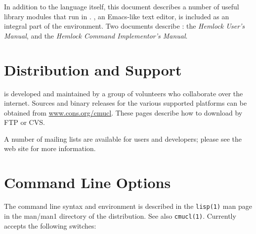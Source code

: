 In addition to the language itself, this document describes a number
of useful library modules that run in \cmucl. \hemlock, an Emacs-like
text editor, is included as an integral part of the \cmucl{}
environment. Two documents describe \hemlock{}: the {\it Hemlock
User's Manual}, and the {\it Hemlock Command Implementor's Manual}.


\section{Distribution and Support}

\cmucl{} is developed and maintained by a group of volunteers who
collaborate over the internet. Sources and binary releases for the
various supported platforms can be obtained from
\href{http://www.cons.org/cmucl/}{www.cons.org/cmucl}. These pages
describe how to download by FTP or CVS.

A number of mailing lists are available for users and developers;
please see the web site for more information. 


\section{Command Line Options}
\label{command-line-options}

The command line syntax and environment is described in the
\verb|lisp(1)| man page in the man/man1 directory of the distribution.
See also \verb|cmucl(1)|. Currently \cmucl{} accepts the following
switches:

